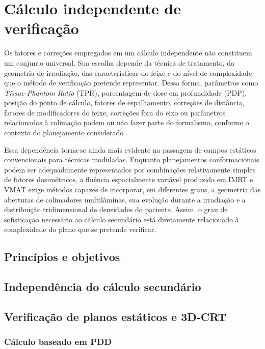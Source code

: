 \chapter{Cálculo independente de verificação}
\label{chap:calculo_independente}

Os fatores e correções empregados em um cálculo independente não constituem um conjunto universal. Sua escolha depende da técnica de tratamento, da geometria de irradiação, das características do feixe e do nível de complexidade que o método de verificação pretende representar. Dessa forma, parâmetros como \emph{Tissue-Phantom Ratio} (TPR), porcentagem de dose em profundidade (PDP), posição do ponto de cálculo, fatores de espalhamento, correções de distância, fatores de modificadores do feixe, correções fora do eixo ou parâmetros relacionados à colimação podem ou não fazer parte do formalismo, conforme o contexto do planejamento considerado \supercite{Zhu2021}.

Essa dependência torna-se ainda mais evidente na passagem de campos estáticos convencionais para técnicas moduladas. Enquanto planejamentos conformacionais podem ser adequadamente representados por combinações relativamente simples de fatores dosimétricos, a fluência espacialmente variável produzida em IMRT e VMAT exige métodos capazes de incorporar, em diferentes graus, a geometria das aberturas de colimadores multilâminas, sua evolução durante a irradiação e a distribuição tridimensional de densidades do paciente. Assim, o grau de sofisticação necessário ao cálculo secundário está diretamente relacionado à complexidade do plano que se pretende verificar.

\section{Princípios e objetivos}
\label{sec:principios_verificacao}

\section{Independência do cálculo secundário}
\label{sec:independencia}

\section{Verificação de planos estáticos e 3D-CRT}
\label{sec:verificacao_3d}

\subsection{Cálculo baseado em PDD}
\label{ssec:calculo_pdd}

